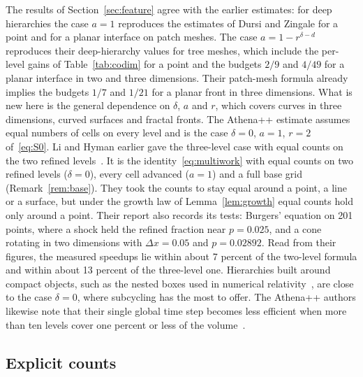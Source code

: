 \documentclass[12pt]{article}
\theoremstyle{remark}
\begin{document}
The results of Section~\ref{sec:feature} agree with the earlier estimates: for deep hierarchies the case $a=1$ reproduces the estimates of Dursi and Zingale for a point and for a planar interface on patch meshes. The case $a=1-r^{\delta-d}$ reproduces their deep-hierarchy values for tree meshes, which include the per-level gains of Table~\ref{tab:codim} for a point and the budgets $2/9$ and $4/49$ for a planar interface in two and three dimensions. Their patch-mesh formula already implies the budgets $1/7$ and $1/21$ for a planar front in three dimensions. What is new here is the general dependence on $\delta$, $a$ and $r$, which covers curves in three dimensions, curved surfaces and fractal fronts. The Athena++ estimate assumes equal numbers of cells on every level and is the case $\delta=0$, $a=1$, $r=2$ of~\eqref{eq:S0}. Li and Hyman earlier gave the three-level case with equal counts on the two refined levels~\cite{li2006local}. It is the identity~\eqref{eq:multiwork} with equal counts on two refined levels ($\delta=0$), every cell advanced ($a=1$) and a full base grid (Remark~\ref{rem:base}). They took the counts to stay equal around a point, a line or a surface, but under the growth law of Lemma~\ref{lem:growth} equal counts hold only around a point. Their report also records its tests: Burgers' equation on 201 points, where a shock held the refined fraction near $p=0.025$, and a cone rotating in two dimensions with $\Delta x=0.05$ and $p=0.02892$. Read from their figures, the measured speedups lie within about 7 percent of the two-level formula and within about 13 percent of the three-level one. Hierarchies built around compact objects, such as the nested boxes used in numerical relativity~\cite{schnetter2004evolutions}, are close to the case $\delta=0$, where subcycling has the most to offer. The Athena++ authors likewise note that their single global time step becomes less efficient when more than ten levels cover one percent or less of the volume~\cite{stone2020athena}.

\subsection{Explicit counts}\label{sec:counts}
\end{document}
